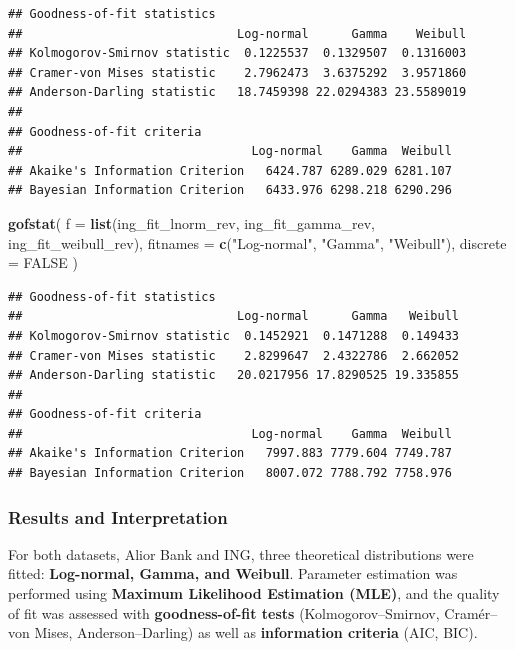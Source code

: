 \documentclass[
]{article}
\newenvironment{Shaded}{\begin{snugshade}}{\end{snugshade}}
\newcommand{\AttributeTok}[1]{\textcolor[rgb]{0.13,0.29,0.53}{#1}}
\newcommand{\ConstantTok}[1]{\textcolor[rgb]{0.56,0.35,0.01}{#1}}
\newcommand{\FunctionTok}[1]{\textcolor[rgb]{0.13,0.29,0.53}{\textbf{#1}}}
\newcommand{\NormalTok}[1]{#1}
\newcommand{\StringTok}[1]{\textcolor[rgb]{0.31,0.60,0.02}{#1}}
\begin{document}
\begin{verbatim}
## Goodness-of-fit statistics
##                              Log-normal      Gamma    Weibull
## Kolmogorov-Smirnov statistic  0.1225537  0.1329507  0.1316003
## Cramer-von Mises statistic    2.7962473  3.6375292  3.9571860
## Anderson-Darling statistic   18.7459398 22.0294383 23.5589019
## 
## Goodness-of-fit criteria
##                                Log-normal    Gamma  Weibull
## Akaike's Information Criterion   6424.787 6289.029 6281.107
## Bayesian Information Criterion   6433.976 6298.218 6290.296
\end{verbatim}

\begin{Shaded}
\begin{Highlighting}[]
\FunctionTok{gofstat}\NormalTok{(}
  \AttributeTok{f =} \FunctionTok{list}\NormalTok{(ing\_fit\_lnorm\_rev, ing\_fit\_gamma\_rev, ing\_fit\_weibull\_rev),}
  \AttributeTok{fitnames =} \FunctionTok{c}\NormalTok{(}\StringTok{"Log{-}normal"}\NormalTok{, }\StringTok{"Gamma"}\NormalTok{, }\StringTok{"Weibull"}\NormalTok{),}
  \AttributeTok{discrete =} \ConstantTok{FALSE}
\NormalTok{)}
\end{Highlighting}
\end{Shaded}

\begin{verbatim}
## Goodness-of-fit statistics
##                              Log-normal      Gamma   Weibull
## Kolmogorov-Smirnov statistic  0.1452921  0.1471288  0.149433
## Cramer-von Mises statistic    2.8299647  2.4322786  2.662052
## Anderson-Darling statistic   20.0217956 17.8290525 19.335855
## 
## Goodness-of-fit criteria
##                                Log-normal    Gamma  Weibull
## Akaike's Information Criterion   7997.883 7779.604 7749.787
## Bayesian Information Criterion   8007.072 7788.792 7758.976
\end{verbatim}

\subsubsection{Results and
Interpretation}\label{results-and-interpretation}

For both datasets, Alior Bank and ING, three theoretical distributions
were fitted: \textbf{Log-normal, Gamma, and Weibull}. Parameter
estimation was performed using \textbf{Maximum Likelihood Estimation
(MLE)}, and the quality of fit was assessed with \textbf{goodness-of-fit
tests} (Kolmogorov--Smirnov, Cramér--von Mises, Anderson--Darling) as
well as \textbf{information criteria} (AIC, BIC).
\end{document}
